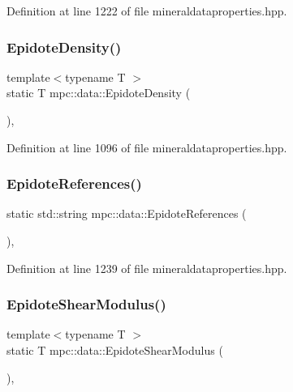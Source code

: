 Definition at line 1222 of file mineraldataproperties.\+hpp.

\mbox{\label{namespacempc_1_1data_a164ce610aeba00d2f0705fc840c601cc}} 
\subsubsection{\texorpdfstring{Epidote\+Density()}{EpidoteDensity()}}
{\footnotesize\ttfamily template$<$typename T $>$ \\
static T mpc\+::data\+::\+Epidote\+Density (\begin{DoxyParamCaption}{ }\end{DoxyParamCaption})\hspace{0.3cm}{\ttfamily [inline]}, {\ttfamily [static]}}



Definition at line 1096 of file mineraldataproperties.\+hpp.

\mbox{\label{namespacempc_1_1data_a193b7ddaf1c44726ac3725cca9cc3791}} 
\subsubsection{\texorpdfstring{Epidote\+References()}{EpidoteReferences()}}
{\footnotesize\ttfamily static std\+::string mpc\+::data\+::\+Epidote\+References (\begin{DoxyParamCaption}{ }\end{DoxyParamCaption})\hspace{0.3cm}{\ttfamily [inline]}, {\ttfamily [static]}}



Definition at line 1239 of file mineraldataproperties.\+hpp.

\mbox{\label{namespacempc_1_1data_a711ec061eb6e213696d2a2c7d30858c2}} 
\subsubsection{\texorpdfstring{Epidote\+Shear\+Modulus()}{EpidoteShearModulus()}}
{\footnotesize\ttfamily template$<$typename T $>$ \\
static T mpc\+::data\+::\+Epidote\+Shear\+Modulus (\begin{DoxyParamCaption}{ }\end{DoxyParamCaption})\hspace{0.3cm}{\ttfamily [inline]}, {\ttfamily [static]}}




